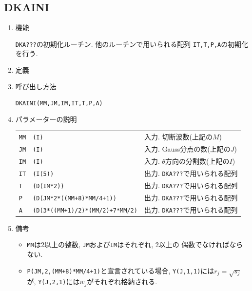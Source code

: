 \documentclass[a4j,fleqn]{jarticle}
\begin{document}
\subsection{DKAINI}

\begin{enumerate}

\item 機能

{\tt DKA???}の初期化ルーチン. 他のルーチンで用いられる配列
{\tt IT,T,P,A}の初期化を行う.

\item 定義

\item 呼び出し方法 
    
{\tt DKAINI(MM,JM,IM,IT,T,P,A)}
  
\item パラメーターの説明 
    
\begin{tabular}{lll}
{\tt MM} & {\tt (I)} & 入力. 切断波数(上記の$M$)\\
{\tt JM} & {\tt (I)} & 入力. Gauss分点の数(上記の$J$)\\
{\tt IM} & {\tt (I)} & 入力. $\theta$方向の分割数(上記の$I$)\\
{\tt IT}  & {\tt (I(5))}    & 出力. {\tt DKA???}で用いられる配列\\
{\tt T}   & {\tt (D(IM*2))} & 出力. {\tt DKA???}で用いられる配列\\
{\tt P}  & {\tt (D(JM*2*((MM+8)*MM/4+1))} & 出力. {\tt DKA???}で用いられる配列\\
{\tt A}  & {\tt (D(3*((MM+1)/2)*(MM/2)+7*MM/2)} & 出力. {\tt DKA???}で用いられる配列
\end{tabular}

\item 備考

\begin{itemize}

\item {\tt MM}は2以上の整数, {\tt JM}および{\tt IM}はそれぞれ, 2以上の
偶数でなければならない.

\item {\tt P(JM,2,(MM+8)*MM/4+1)}と宣言されている場合, 
   {\tt Y(J,1,1)}には$r_j=\sqrt{s_j}$が, 
   {\tt Y(J,2,1)}には$w_j$がそれぞれ格納される.

\end{itemize}

\end{enumerate}

\end{document}

